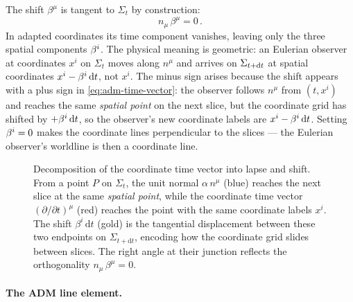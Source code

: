 The shift $\beta^\mu$ is tangent to $\Sigma_t$ by construction:
%
\begin{equation}
  n_\mu\,\beta^\mu = 0 \,.
  \label{eq:adm-shift-tangent}
\end{equation}
%
In adapted coordinates its time component vanishes, leaving only the
three spatial components $\beta^{i}$.  The physical meaning is geometric:
an Eulerian observer at coordinates $x^i$ on $\Sigma_t$ moves along
$n^\mu$ and arrives on $\Sigma_{t+\mathrm{d} t}$ at spatial coordinates
$x^i - \beta^i\,\mathrm{d} t$, not $x^i$.  The minus sign arises because the
shift appears with a plus sign in \cref{eq:adm-time-vector}: the
observer follows $n^\mu$ from $(t, x^i)$ and reaches the same
\emph{spatial point} on the next slice, but the coordinate grid has
shifted by $+\beta^i\,\mathrm{d} t$, so the observer's new coordinate labels
are $x^i - \beta^i\,\mathrm{d} t$.  Setting $\beta^{i} = 0$ makes the coordinate
lines perpendicular to the slices --- the Eulerian observer's worldline
is then a coordinate line.

\begin{figure}[htbp]
  \centering
  
  \caption[Decomposition of the coordinate time vector into lapse and
    shift]{%
    Decomposition of the coordinate time vector into lapse and shift.
    From a point $P$ on $\Sigma_t$, the unit normal $\alpha\,n^\mu$
    (blue) reaches the next slice at the same \emph{spatial point},
    while the coordinate time vector
    $(\partial/\partial t)^\mu$ (red) reaches the point with the same
    coordinate labels $x^i$.  The shift $\beta^i\,\mathrm{d}t$ (gold)
    is the tangential displacement between these two endpoints on
    $\Sigma_{t+\mathrm{d}t}$, encoding how the coordinate grid slides
    between slices.  The right angle at their junction reflects the
    orthogonality $n_\mu\,\beta^\mu = 0$.}
  \label{fig:adm-lapse-shift}
\end{figure}

\paragraph{The ADM line element.}

